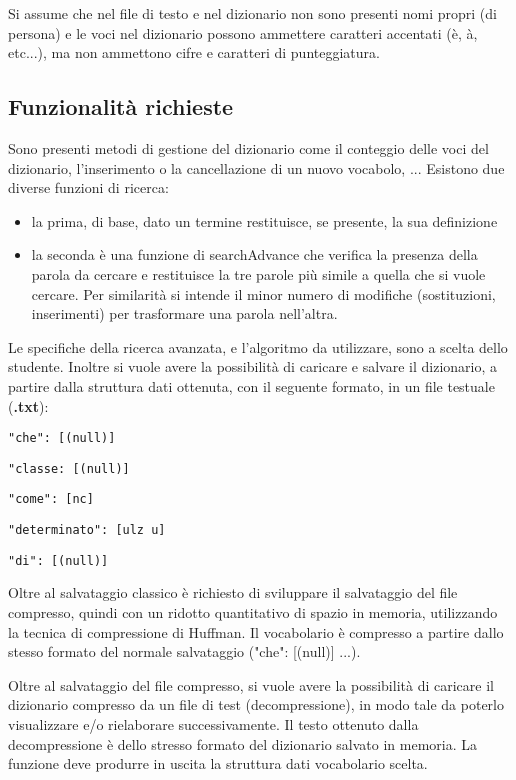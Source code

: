\documentclass[paper=a4, fontsize=11pt,twoside]{scrartcl}   %
\begin{document}
				Si assume che nel file di testo e nel dizionario non sono presenti nomi propri (di persona) e le voci nel dizionario possono ammettere caratteri accentati (è, à, etc...), ma non ammettono cifre e caratteri di punteggiatura.
			
			\subsection{Funzionalità richieste}
				Sono presenti metodi di gestione del dizionario come il conteggio delle voci del dizionario, l'inserimento o la cancellazione di un nuovo vocabolo, ...				
				Esistono due diverse funzioni di ricerca:
				\begin{itemize}
					\item la prima, di base, dato un termine restituisce, se presente, la sua definizione
					\item la seconda è una funzione di searchAdvance che verifica la presenza della parola da cercare e restituisce la tre parole più simile a quella che si vuole cercare. Per similarità si intende il minor numero di modifiche (sostituzioni, inserimenti) per trasformare una parola nell'altra.
				\end{itemize} \pagebreak
				 Le specifiche della ricerca avanzata, e l'algoritmo da utilizzare, sono a scelta dello studente. Inoltre si vuole avere la possibilità di caricare e salvare il dizionario, a partire dalla struttura dati ottenuta, con il seguente formato, in un file testuale (\textbf{.txt}):
				 \begin{trivlist}
				 	\item \texttt{"che": [(null)]}
				 	\item \texttt{"classe: [(null)]}
				 	\item \texttt{"come": [nc]}
				 	\item \texttt{"determinato": [ulz u]}
				 	\item \texttt{"di": [(null)]}
				 \end{trivlist}
			 	 Oltre al salvataggio classico è richiesto di sviluppare il salvataggio del file compresso, quindi con un ridotto quantitativo di spazio in memoria, utilizzando la tecnica di compressione di Huffman. Il vocabolario è compresso a partire dallo stesso formato del normale salvataggio ("che": [(null)] ...). 
			 	 
			 	 Oltre al salvataggio del file compresso, si vuole avere la possibilità di caricare il dizionario compresso da un file di test (decompressione), in modo tale da poterlo visualizzare e/o rielaborare successivamente. Il testo ottenuto dalla decompressione è dello stresso formato del dizionario salvato in memoria. La funzione deve produrre in uscita la struttura dati vocabolario scelta.
			 	 \newpage
\end{document}
